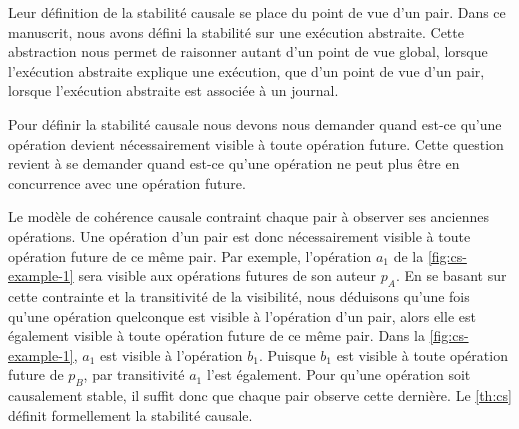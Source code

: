 Leur définition de la stabilité causale se place du point de vue d'un pair.
Dans ce manuscrit, nous avons défini la stabilité sur une exécution abstraite.
Cette abstraction nous permet de raisonner autant d'un point de vue global, lorsque l'exécution abstraite explique une exécution, que d'un point de vue d'un pair, lorsque l'exécution abstraite est associée à un journal.

Pour définir la stabilité causale nous devons nous demander quand est-ce qu'une opération devient nécessairement visible à toute opération future.
Cette question revient à se demander quand est-ce qu'une opération ne peut plus être en concurrence avec une opération future.

Le modèle de cohérence causale contraint chaque pair à observer ses anciennes opérations.
Une opération d'un pair est donc nécessairement visible à toute opération future de ce même pair.
Par exemple, l'opération $a_1$ de la \autoref{fig:cs-example-1} sera visible aux opérations futures de son auteur $p_A$.
En se basant sur cette contrainte et la transitivité de la visibilité, nous déduisons qu'une fois qu'une opération quelconque est visible à l'opération d'un pair, alors elle est également visible à toute opération future de ce même pair.
Dans la \autoref{fig:cs-example-1}, $a_1$ est visible à l'opération $b_1$.
Puisque $b_1$ est visible à toute opération future de $p_B$, par transitivité $a_1$ l'est également.
Pour qu'une opération soit causalement stable, il suffit donc que chaque pair observe cette dernière.
Le \autoref{th:cs} définit formellement la stabilité causale.

